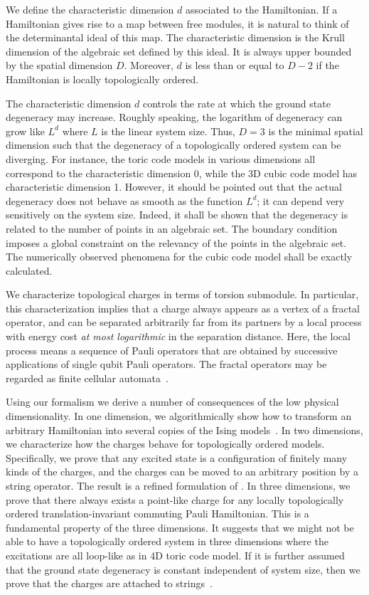 \documentclass[letterpaper,12pt]{amsart}
\theoremstyle{definition} \newtheorem{defn}{Definition}
\theoremstyle{definition} \newtheorem{rem}{Remark}
\theoremstyle{definition} \newtheorem{example}{Example}
\begin{document}
We define the characteristic dimension $d$ associated to the Hamiltonian.
If a Hamiltonian gives rise to a map between free modules,
it is natural to think of the determinantal ideal of this map.
The characteristic dimension is the Krull dimension of
the algebraic set defined by this ideal.
It is always upper bounded by the spatial dimension $D$.
Moreover, $d$ is less than or equal to $D-2$ if the Hamiltonian is locally topologically ordered.

The characteristic dimension $d$ 
controls the rate at which the ground state degeneracy may increase.
Roughly speaking, the logarithm of degeneracy can grow like $L^d$ 
where $L$ is the linear system size.
Thus, $D=3$ is the minimal spatial dimension such that the degeneracy
of a topologically ordered system can be diverging.
For instance, the toric code models in various dimensions
all correspond to the characteristic dimension 0,
while the 3D cubic code model has characteristic dimension 1.
However, it should be pointed out that
the actual degeneracy does not behave as smooth as the function $L^d$;
it can depend very sensitively on the system size.
Indeed, it shall be shown that the degeneracy is related to the number of points in an algebraic set.
The boundary condition imposes a global constraint on the relevancy of the points in the algebraic set.
The numerically observed phenomena for the cubic code model shall be exactly calculated.



We characterize topological charges in terms of torsion submodule.
In particular, this characterization implies that
a charge always appears as a vertex of a fractal operator,
and can be separated arbitrarily far from its partners
by a local process with energy cost \emph{at most logarithmic} in the separation distance.
Here, the local process means a sequence of Pauli operators
that are obtained by successive applications of single qubit Pauli operators.
The fractal operators may be regarded as finite cellular automata~\cite{MartinOdlyzkoAndrewWolfram1984}.


Using our formalism we derive a number of consequences of the low physical dimensionality.
In one dimension, we algorithmically show how to transform
an arbitrary Hamiltonian into several copies of the Ising models~\cite{Yoshida2011Classification}.
%
In two dimensions, we characterize how the charges behave for topologically ordered models.
Specifically, we prove that any excited state is
a configuration of finitely many kinds of the charges,
and the charges can be moved to an arbitrary position by a string operator.
The result is a refined formulation of \cite{
Yoshida2011Classification,
Bombin2011Structure,
BombinDuclosCianciPoulin2012}.
%
In three dimensions, we prove that there always exists a point-like charge
for any locally topologically ordered translation-invariant commuting Pauli Hamiltonian.
This is a fundamental property of the three dimensions.
It suggests that we might not be able to have a topologically ordered
system in three dimensions where the excitations are all loop-like as in 4D toric code model.
If it is further assumed that the ground state degeneracy is constant
independent of system size, then we prove that the charges are attached to strings~\cite{Yoshida2011feasibility}.
\end{document}
